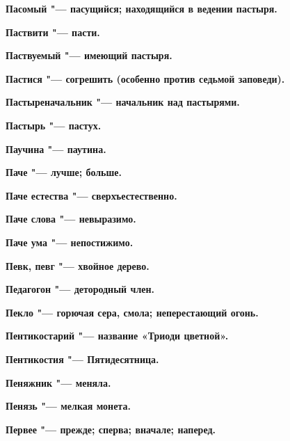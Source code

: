 \begin{multicols}{2}
\bfseries Пасомый\normalfont{} "--- пасущийся; находящийся в ведении пастыря. 




\bfseries Паствити\normalfont{} "--- пасти. 




\bfseries Паствуемый\normalfont{} "--- имеющий пастыря. 




\bfseries Пастися\normalfont{} "--- согрешить (особенно против седьмой заповеди). 




\bfseries Пастыреначальник\normalfont{} "--- начальник над пастырями. 




\bfseries Пастырь\normalfont{} "--- пастух. 




\bfseries Паучина\normalfont{} "--- паутина. 




\bfseries Паче\normalfont{} "--- лучше; больше. 




\bfseries Паче естества\normalfont{} "--- сверхъестественно. 




\bfseries Паче слова\normalfont{} "--- невыразимо. 




\bfseries Паче ума\normalfont{} "--- непостижимо. 




\bfseries Певк, певг\normalfont{} "--- хвойное дерево. 




\bfseries Педагогон\normalfont{} "--- детородный член. 




\bfseries Пекло\normalfont{} "--- горючая сера, смола; неперестающий огонь. 




\bfseries Пентикостарий\normalfont{} "--- название «Триоди цветной». 




\bfseries Пентикостия\normalfont{} "--- Пятидесятница. 




\bfseries Пеняжник\normalfont{} "--- меняла. 




\bfseries Пенязь\normalfont{} "--- мелкая монета. 




\bfseries Первее\normalfont{} "--- прежде; сперва; вначале; наперед. 





\end{multicols}
